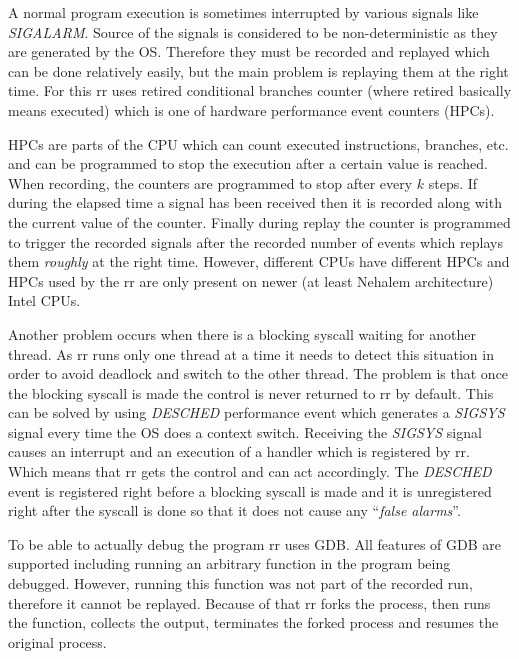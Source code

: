 \documentclass[thesis=M,english,hidelinks]{FITthesis}[2012/10/20]
\newcommand*{\qt}[1]{\enquote{{\itshape#1}}}
\begin{document}
		A normal program execution is sometimes interrupted by various signals like \emph{SIGALARM}. Source of the signals is considered to be non-deterministic as they are generated by the OS. Therefore they must be recorded and replayed which can be done relatively easily, but the main problem is replaying them at the right time. For this rr uses retired conditional branches counter (where retired basically means executed) which is one of hardware performance event counters (HPCs).\par
		
		HPCs are parts of the CPU which can count executed instructions, branches, etc. and can be programmed to stop the execution after a certain value is reached. When recording, the counters are programmed to stop after every $k$ steps. If during the elapsed time a signal has been received then it is recorded along with the current value of the counter. Finally during replay the counter is programmed to trigger the recorded signals after the recorded number of events which replays them \emph{roughly} at the right time. However, different CPUs have different HPCs and HPCs used by the rr are only present on newer (at least Nehalem architecture) Intel CPUs.\par
		
		Another problem occurs when there is a blocking syscall waiting for another thread. As rr runs only one thread at a time it needs to detect this situation in order to avoid deadlock and switch to the other thread. The problem is that once the blocking syscall is made the control is never returned to rr by default. This can be solved by using \emph{DESCHED} performance event which generates a \emph{SIGSYS} signal every time the OS does a context switch. Receiving the \emph{SIGSYS} signal causes an interrupt and an execution of a handler which is registered by rr. Which means that rr gets the control and can act accordingly. The \emph{DESCHED} event is registered right before a blocking syscall is made and it is unregistered right after the syscall is done so that it does not cause any \qt{false alarms}.\par
		
		To be able to actually debug the program rr uses GDB. All features of GDB are supported including running an arbitrary function in the program being debugged. However, running this function was not part of the recorded run, therefore it cannot be replayed. Because of that rr forks the process, then runs the function, collects the output, terminates the forked process and resumes the original process.\par
		
\end{document}
